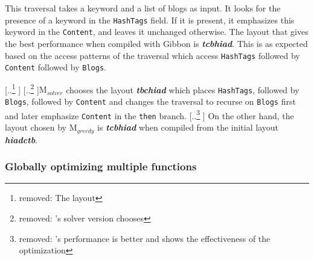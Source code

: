\documentclass[acmsmall,review,anonymous]{acmart}\settopmatter{printfolios=true,printccs=false,printacmref=false}
\newcommand{\system}{{\sc Marmoset}\xspace}
\newcommand{\systemSolver}{{\sc M$_{\mathit{solver}}$}\xspace} %
\newcommand{\systemGreedy}{{\sc M$_{\mathit{greedy}}$}\xspace} %
\newcommand{\gibbon}{{\sc Gibbon}\xspace}
\providecommand{\DIFaddtex}[1]{{\protect\color{blue} \sf #1}} %
\providecommand{\DIFdeltex}[1]{{\protect\color{red} [..\footnote{removed: #1} ]}} %
\providecommand{\DIFaddbegin}{} %
\providecommand{\DIFaddend}{} %
\providecommand{\DIFdelbegin}{} %
\providecommand{\DIFdelend}{} %
\providecommand{\DIFadd}[1]{\texorpdfstring{\DIFaddtex{#1}}{#1}} %
\providecommand{\DIFdel}[1]{\texorpdfstring{\DIFdeltex{#1}}{}} %
\newcommand{\DIFscaledelfig}{0.5}
\newlength{\DIFdelgraphicswidth} %
\newlength{\DIFdelgraphicsheight} %
\newcommand{\DIFaddincludegraphics}[2][]{{\color{blue}\fbox{\DIFOincludegraphics[#1]{#2}}}} %
\newcommand{\DIFdelincludegraphics}[2][]{%
\sbox{\DIFdelgraphicsbox}{\DIFOincludegraphics[#1]{#2}}%
\settoboxwidth{\DIFdelgraphicswidth}{\DIFdelgraphicsbox} %
\settoboxtotalheight{\DIFdelgraphicsheight}{\DIFdelgraphicsbox} %
\scalebox{\DIFscaledelfig}{%
\parbox[b]{\DIFdelgraphicswidth}{\usebox{\DIFdelgraphicsbox}\\[-\baselineskip] \rule{\DIFdelgraphicswidth}{0em}}\llap{\resizebox{\DIFdelgraphicswidth}{\DIFdelgraphicsheight}{%
\setlength{\unitlength}{\DIFdelgraphicswidth}%
\begin{picture}(1,1)%
\thicklines\linethickness{2pt} %
{\color[rgb]{1,0,0}\put(0,0){\framebox(1,1){}}}%
{\color[rgb]{1,0,0}\put(0,0){\line( 1,1){1}}}%
{\color[rgb]{1,0,0}\put(0,1){\line(1,-1){1}}}%
\end{picture}%
}\hspace*{3pt}}} %
} %
\DeclareRobustCommand{\DIFaddbegin}{\DIFOaddbegin \let\includegraphics\DIFaddincludegraphics} %
\DeclareRobustCommand{\DIFaddend}{\DIFOaddend \let\includegraphics\DIFOincludegraphics} %
\DeclareRobustCommand{\DIFdelbegin}{\DIFOdelbegin \let\includegraphics\DIFdelincludegraphics} %
\DeclareRobustCommand{\DIFdelend}{\DIFOaddend \let\includegraphics\DIFOincludegraphics} %
\begin{document}
This traversal takes a keyword and a list of blogs as input. It looks for the presence of a keyword in the \lstinline{HashTags} field.
If it is present, it emphasizes this keyword in the \lstinline{Content}, and leaves it unchanged otherwise.
The layout that gives the best performance when compiled with \gibbon is \textbf{\textit{tcbhiad}}. This is as expected based on the 
access patterns of the traversal which access \lstinline{HashTags} followed by \lstinline{Content} followed by \lstinline{Blogs}.
\DIFdelbegin %

\DIFdel{The layout }%
\DIFdel{'s solver version chooses }\DIFdelend \DIFaddbegin \systemSolver \DIFadd{chooses the layout \textbf{\textit{tbchiad}} which }\DIFaddend places \lstinline|HashTags|, followed by \lstinline|Blogs|, 
followed by \lstinline|Content| and changes the traversal to recurse on \lstinline|Blogs| first and later emphasize
\lstinline|Content| in the \lstinline|then| branch. \DIFdelbegin %
\DIFdel{'s performance is better and shows the effectiveness of the optimization}\DIFdelend \DIFaddbegin \DIFadd{On the other hand, the layout chosen by }\systemGreedy \DIFadd{is \textbf{\textit{tcbhiad}}
when compiled from the initial layout \textbf{\textit{hiadctb}}}\DIFaddend .




\subsubsection{\bf Globally optimizing multiple functions}
\end{document}

